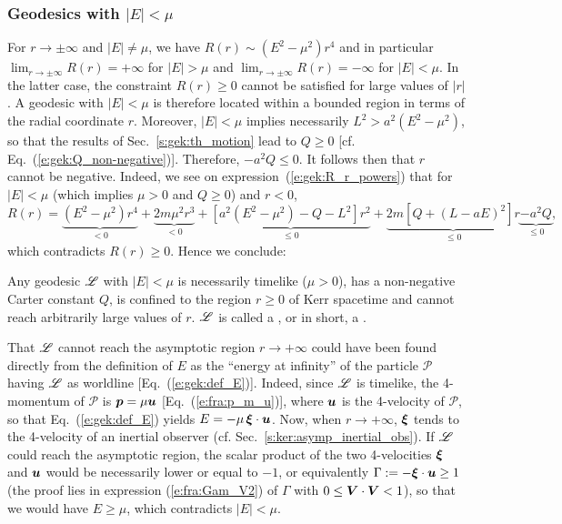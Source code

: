 \subsubsection{Geodesics with $|E|<\mu$} \label{s:gek:bound_geod}

For $r\to \pm\infty$ and $|E|\neq \mu$,
we have $R(r) \sim (E^2 - \mu^2) r^4$ and in
particular $\lim_{r\to\pm\infty} R(r) = + \infty$ for $|E|>\mu$
and $\lim_{r\to\pm\infty} R(r) = - \infty$ for $|E|<\mu$. In the latter case,
the constraint $R(r) \geq 0$ cannot be satisfied for large values
of $|r|$. A geodesic with $|E|<\mu$ is therefore located within a bounded
region in terms of the radial coordinate $r$. Moreover, $|E|<\mu$
implies necessarily $L^2 > a^2 (E^2 - \mu^2)$, so that
the results of
Sec.~\ref{s:gek:th_motion} lead to $Q\geq 0$
[cf. Eq.~(\ref{e:gek:Q_non-negative})]. Therefore, $-a^2 Q \leq 0$.
It follows then that $r$ cannot be negative.
Indeed, we see
on expression~(\ref{e:gek:R_r_powers}) that for $|E|<\mu$ (which implies $\mu>0$ and $Q\geq 0$) and $r<0$,
\[
    R(r) = \underbrace{(E^2 - \mu^2) r^4}_{<0} + \underbrace{2 m \mu^2 r^3}_{<0}
     + \underbrace{\left[ a^2 (E^2 - \mu^2) - Q - L^2 \right] r^2}_{\leq 0}
     + \underbrace{2m\left[ Q + (L - a E)^2 \right] r}_{\leq 0}
     \underbrace{-a^2 Q}_{\leq 0} ,
\]
which contradicts $R(r)\geq 0$.
Hence we conclude:
\begin{prop}
Any geodesic $\mathscr{L}$ with $|E|<\mu$ is necessarily timelike ($\mu >0$),
has a non-negative Carter constant $Q$,
is confined to the region $r\geq 0$ of Kerr spacetime
and cannot reach arbitrarily large values of $r$. $\mathscr{L}$ is called a
,
or in short, a .
\end{prop}
\begin{remark} \label{r:gek:bound_geod}
That $\mathscr{L}$
cannot reach the asymptotic region $r\to +\infty$ could have been
found directly from the definition of $E$ as the ``energy at infinity''
of the particle $\mathscr{P}$ having $\mathscr{L}$ as worldline
[Eq.~(\ref{e:gek:def_E})]. Indeed, since $\mathscr{L}$ is timelike, the 4-momentum
of $\mathscr{P}$ is $\bm{p} = \mu \bm{u}$ [Eq.~(\ref{e:fra:p_m_u})], where
$\bm{u}$ is the 4-velocity of $\mathscr{P}$, so that Eq.~(\ref{e:gek:def_E})
yields $E = - \mu\, \bm{\xi}\cdot\bm{u}$. Now, when $r\to +\infty$, $\bm{\xi}$
tends to the 4-velocity of an inertial observer (cf. Sec.~\ref{s:ker:asymp_inertial_obs}).
If $\mathscr{L}$ could reach the asymptotic region,
the scalar
product of the two 4-velocities $\bm{\xi}$ and
$\bm{u}$ would be necessarily lower or equal to $-1$, or equivalently
$\Gamma := - \bm{\xi}\cdot\bm{u} \geq 1$ (the proof lies in expression
(\ref{e:fra:Gam_V2}) of $\Gamma$ with $0\leq \bm{V}\cdot\bm{V} < 1$), so that
we would have $E \geq \mu$, which contradicts $|E|<\mu$.
\end{remark}

